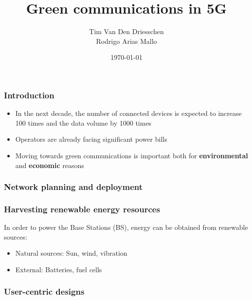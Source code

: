 \documentclass[a4paper,12pt,handout]{beamer}
\title{Green communications in 5G}
\author{Tim Van Den Driesschen\\Rodrigo Arias Mallo}
\institute{Universitat Politècnica de Catalunya}
\date{\today}
\begin{document}
\begin{frame}
	\titlepage
\end{frame}
\note{}
\begin{frame}
\frametitle{Introduction}
\begin{itemize}

\item In the next decade, the number of connected devices is expected to 
increase 100 times and the data volume by 1000 times

\item Operators are already facing significant power bills

\item Moving towards green communications is important both for 
\textbf{environmental} and \textbf{economic} reasons

\end{itemize}
\end{frame}
\note{}
\begin{frame}
	\frametitle{Network planning and deployment}
\end{frame}
\note{}
\begin{frame}
\frametitle{Harvesting renewable energy resources}
In order to power the Base Stations (BS), energy can be obtained from renewable 
sources:

\begin{itemize}
\item Natural sources: Sun, wind, vibration
\item External: Batteries, fuel cells
\end{itemize}
\end{frame}
\begin{frame}
	\frametitle{User-centric designs}
\end{frame}
\end{document}
